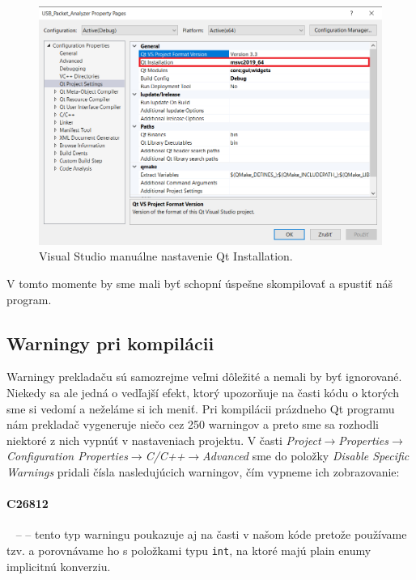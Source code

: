 \begin{figure}[!htb]
	\centering
	\includegraphics[width=12cm]{img/kap04_vs_manual}
	\caption{Visual Studio manuálne nastavenie Qt Installation.}
	\label{obr:kap4:vs_manual}
\end{figure}

V tomto momente by sme mali byť schopní úspešne skompilovať a spustiť náš program.

\subsection{Warningy pri kompilácii}
Warningy prekladaču sú samozrejme veľmi dôležité a nemali by byť ignorované. Niekedy sa ale jedná o vedľajší efekt, ktorý upozorňuje na časti kódu o ktorých sme si vedomí a neželáme si ich meniť. Pri kompilácii prázdneho Qt programu nám prekladač vygeneruje niečo cez 250 warningov a preto sme sa rozhodli niektoré z nich vypnúť v nastaveniach projektu. V časti \textit{Project}$\rightarrow$\textit{Properties}$\rightarrow$\newline\textit{Configuration Properties}$\rightarrow$\textit{C/C++}$\rightarrow$\textit{Advanced} sme do položky \textit{Disable Specific Warnings} pridali čísla nasledujúcich warningov, čím vypneme ich zobrazovanie:

\paragraph{C26812}~\cite{warningc26812} --  -- tento typ warningu poukazuje aj na časti v našom kóde pretože používame tzv.  a porovnávame ho s položkami typu \texttt{int}, na ktoré majú plain enumy implicitnú konverziu.

